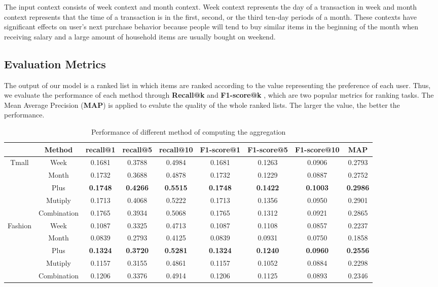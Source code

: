 \documentclass[conference]{IEEEtran}
\begin{document}
The input context consists of week context and month context. Week context represents the day of a transaction in week and month context represents that the time of a transaction is in the first, second, or the third ten-day periods of a month. These contexts have significant effects on user's next purchase behavior because people will tend to buy similar items in the beginning of the month when receiving salary and a large amount of household items are usually bought on weekend.


\subsection{Evaluation Metrics}
The output of our model is a ranked list in which items are ranked according to the value representing the preference of each user. Thus, we evaluate the performance of each method through \textbf{Recall@k} and \textbf{F1-score@k} , which are two popular metrics for ranking tasks. The Mean Average Precision (\textbf{MAP}) is applied to evalute the quality of the whole ranked lists. The larger the value, the better the performance.

\begin{table}[!htbp]
\centering\scriptsize
\caption{Performance of different method of computing the aggregation}
    \begin{tabular}{ccccccccc}
    \toprule
          & Method& recall@1 & recall@5 & recall@10&F1-score@1 & F1-score@5 & F1-score@10&MAP\\
    \midrule
    \multirow{5}[0]{*}{Tmall} 
        &Week& 0.1681& 0.3788& 0.4984& 0.1681& 0.1263& 0.0906&0.2793\\
        &Month& 0.1732& 0.3688& 0.4878& 0.1732& 0.1229& 0.0887&0.2752\\
        &Plus& \textbf{0.1748}& \textbf{0.4266}& \textbf{0.5515}& \textbf{0.1748}& \textbf{0.1422}& \textbf{0.1003}& \textbf{0.2986}\\
        &Mutiply& 0.1713& 0.4068& 0.5222& 0.1713& 0.1356& 0.0950&0.2901\\
        &Combination& 0.1765& 0.3934& 0.5068& 0.1765& 0.1312& 0.0921&0.2865\\
    \midrule
    \multirow{5}[0]{*}{Fashion} 
        &Week& 0.1087& 0.3325& 0.4713& 0.1087& 0.1108& 0.0857&0.2237\\
        &Month& 0.0839& 0.2793& 0.4125& 0.0839& 0.0931& 0.0750&0.1858\\
        &Plus& \textbf{0.1324}& \textbf{0.3720}& \textbf{0.5281}& \textbf{0.1324}& \textbf{0.1240}& \textbf{0.0960}& \textbf{0.2556}\\
        &Mutiply& 0.1157& 0.3155& 0.4861& 0.1157& 0.1052& 0.0884&0.2298\\
        &Combination& 0.1206& 0.3376& 0.4914& 0.1206& 0.1125& 0.0893&0.2346\\
    \bottomrule
\end{tabular}%
\end{table}%
\end{document}
